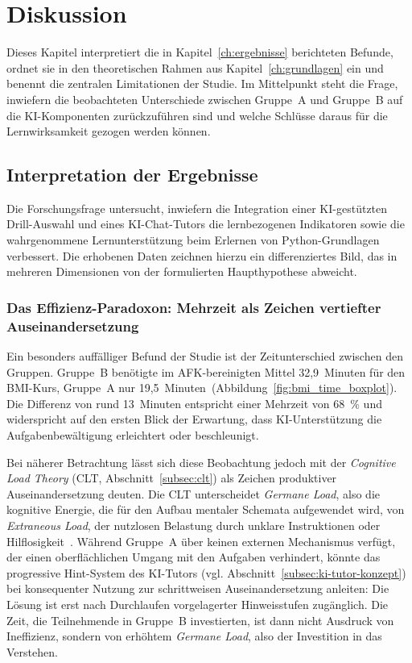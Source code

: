\clearpage

\chapter{\textbf{Diskussion}}\label{ch:diskussion}

Dieses Kapitel interpretiert die in Kapitel~\ref{ch:ergebnisse} berichteten Befunde, ordnet sie in den theoretischen Rahmen aus Kapitel~\ref{ch:grundlagen} ein und benennt die zentralen Limitationen der Studie. Im Mittelpunkt steht die Frage, inwiefern die beobachteten Unterschiede zwischen Gruppe~A und Gruppe~B auf die KI-Komponenten zurückzuführen sind und welche Schlüsse daraus für die Lernwirksamkeit gezogen werden können.


\section{Interpretation der Ergebnisse}\label{sec:interpretation}

Die Forschungsfrage untersucht, inwiefern die Integration einer KI-gestützten Drill-Auswahl und eines KI-Chat-Tutors die lernbezogenen Indikatoren sowie die wahrgenommene Lernunterstützung beim Erlernen von Python-Grundlagen verbessert. Die erhobenen Daten zeichnen hierzu ein differenziertes Bild, das in mehreren Dimensionen von der formulierten Haupthypothese abweicht.

\subsection{Das Effizienz-Paradoxon: Mehrzeit als Zeichen vertiefter Auseinandersetzung}\label{subsec:diskussion_zeit}

Ein besonders auffälliger Befund der Studie ist der Zeitunterschied zwischen den Gruppen. Gruppe~B benötigte im AFK-bereinigten Mittel 32{,}9~Minuten für den BMI-Kurs, Gruppe~A nur 19{,}5~Minuten~(Abbildung~\ref{fig:bmi_time_boxplot}). Die Differenz von rund 13~Minuten entspricht einer Mehrzeit von 68~\% und widerspricht auf den ersten Blick der Erwartung, dass KI-Unterstützung die Aufgabenbewältigung erleichtert oder beschleunigt.

Bei näherer Betrachtung lässt sich diese Beobachtung jedoch mit der \textit{Cognitive Load Theory} (CLT, Abschnitt~\ref{subsec:clt}) als Zeichen produktiver Auseinandersetzung deuten. Die CLT unterscheidet \textit{Germane Load}, also die kognitive Energie, die für den Aufbau mentaler Schemata aufgewendet wird, von \textit{Extraneous Load}, der nutzlosen Belastung durch unklare Instruktionen oder Hilflosigkeit~\cite{sweller1998}. Während Gruppe~A über keinen externen Mechanismus verfügt, der einen oberflächlichen Umgang mit den Aufgaben verhindert, könnte das progressive Hint-System des KI-Tutors (vgl. Abschnitt~\ref{subsec:ki-tutor-konzept}) bei konsequenter Nutzung zur schrittweisen Auseinandersetzung anleiten: Die Lösung ist erst nach Durchlaufen vorgelagerter Hinweisstufen zugänglich. Die Zeit, die Teilnehmende in Gruppe~B investierten, ist dann nicht Ausdruck von Ineffizienz, sondern von erhöhtem \textit{Germane Load}, also der Investition in das Verstehen.

